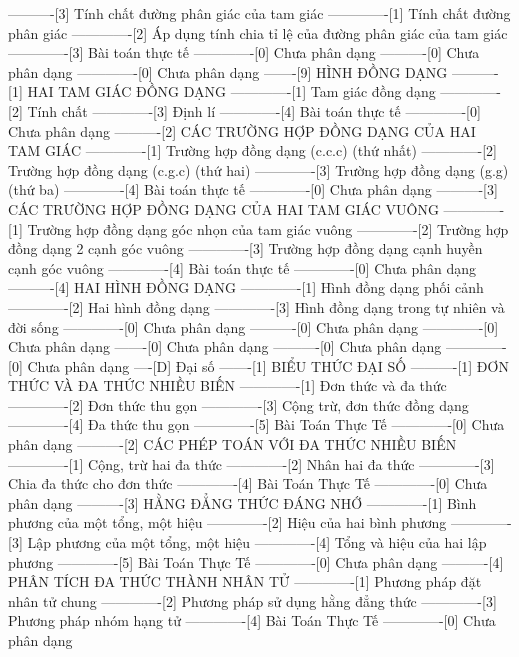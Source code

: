 ----------[3] Tính chất đường phân giác của tam giác
-------------[1] Tính chất đường phân giác
-------------[2] Áp dụng tính chia tỉ lệ của đường phân giác của tam giác
-------------[3] Bài toán thực tế
-------------[0] Chưa phân dạng
----------[0] Chưa phân dạng
-------------[0] Chưa phân dạng
-------[9] HÌNH ĐỒNG DẠNG
----------[1] HAI TAM GIÁC ĐỒNG DẠNG
-------------[1] Tam giác đồng dạng
-------------[2] Tính chất
-------------[3] Định lí
-------------[4] Bài toán thực tế
-------------[0] Chưa phân dạng
----------[2] CÁC TRƯỜNG HỢP ĐỒNG DẠNG CỦA HAI TAM GIÁC
-------------[1] Trường hợp đồng dạng (c.c.c) (thứ nhất)
-------------[2] Trường hợp đồng dạng (c.g.c) (thứ hai)
-------------[3] Trường hợp đồng dạng (g.g) (thứ ba)
-------------[4] Bài toán thực tế
-------------[0] Chưa phân dạng
----------[3] CÁC TRƯỜNG HỢP ĐỒNG DẠNG CỦA HAI TAM GIÁC VUÔNG
-------------[1] Trường hợp đồng dạng góc nhọn của tam giác vuông
-------------[2] Trường hợp đồng dạng 2 cạnh góc vuông
-------------[3] Trường hợp đồng dạng cạnh huyền cạnh góc vuông
-------------[4] Bài toán thực tế
-------------[0] Chưa phân dạng
----------[4] HAI HÌNH ĐỒNG DẠNG
-------------[1] Hình đồng dạng phối cảnh
-------------[2] Hai hình đồng dạng
-------------[3] Hình đồng dạng trong tự nhiên và đời sống
-------------[0] Chưa phân dạng
----------[0] Chưa phân dạng
-------------[0] Chưa phân dạng
-------[0] Chưa phân dạng
----------[0] Chưa phân dạng
-------------[0] Chưa phân dạng
----[D] Đại số
-------[1] BIỂU THỨC ĐẠI SỐ
----------[1] ĐƠN THỨC VÀ ĐA THỨC NHIỀU BIẾN
-------------[1] Đơn thức và đa thức
-------------[2] Đơn thức thu gọn
-------------[3] Cộng trừ, đơn thức đồng dạng
-------------[4] Đa thức thu gọn
-------------[5] Bài Toán Thực Tế
-------------[0] Chưa phân dạng
----------[2] CÁC PHÉP TOÁN VỚI ĐA THỨC NHIỀU BIẾN
-------------[1] Cộng, trừ hai đa thức
-------------[2] Nhân hai đa thức
-------------[3] Chia đa thức cho đơn thức
-------------[4] Bài Toán Thực Tế
-------------[0] Chưa phân dạng
----------[3] HẰNG ĐẲNG THỨC ĐÁNG NHỚ
-------------[1] Bình phương của một tổng, một hiệu
-------------[2] Hiệu của hai bình phương
-------------[3] Lập phương của một tổng, một hiệu
-------------[4] Tổng và hiệu của hai lập phương
-------------[5] Bài Toán Thực Tế
-------------[0] Chưa phân dạng
----------[4] PHÂN TÍCH ĐA THỨC THÀNH NHÂN TỬ
-------------[1] Phương pháp đặt nhân tử chung
-------------[2] Phương pháp sử dụng hằng đẳng thức
-------------[3] Phương pháp nhóm hạng tử
-------------[4] Bài Toán Thực Tế
-------------[0] Chưa phân dạng
